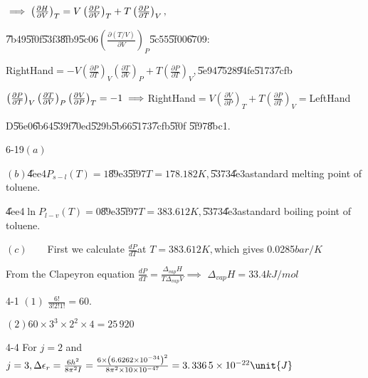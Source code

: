 \documentclass{article}
\begin{document}
$\implies \left( \frac{\partial H}{\partial V}\right) _{T}=V\left( \frac{%
\partial P}{\partial V}\right) _{T}+T\left( \frac{\partial P}{\partial T}%
\right) _{V},$

\U{7b49}\U{5f0f}\U{53f3}\U{8fb9}\U{5c06}$\left( \frac{\partial \left(
T/V\right) }{\partial V}\right) _{P}$\U{5c55}\U{5f00}\U{6709}:

\bigskip RightHand$=-V\left( \frac{\partial P}{\partial T}\right) _{V}\left( 
\frac{\partial T}{\partial V}\right) _{P}+T\left( \frac{\partial P}{\partial
T}\right) _{V},$\U{5e94}\U{7528}\U{94fe}\U{5173}\U{7cfb}

$\left( \frac{\partial P}{\partial T}\right) _{V}\left( \frac{\partial T}{%
\partial V}\right) _{P}\left( \frac{\partial V}{\partial P}\right)
_{T}=-1\implies $RightHand$=V\left( \frac{\partial V}{\partial P}\right)
_{T}+T\left( \frac{\partial P}{\partial T}\right) _{V}=$LeftHand

D\U{56e0}\U{6b64}\U{539f}\U{70ed}\U{529b}\U{5b66}\U{5173}\U{7cfb}\U{5f0f}%
\U{5f97}\U{8bc1}.

6-19$\left( a\right) $


$\left( b\right) $\U{4ee4}$P_{s-l}\left( T\right) =1$\U{89e3}\U{5f97}\qquad $%
T=178.182\unit{K},$\U{5373}\U{4e3a}standard melting point of toluene.

\U{4ee4}$\ln P_{l-v}\left( T\right) =0$\U{89e3}\U{5f97}\qquad $T=383.612%
\unit{K},$\U{5373}\U{4e3a}standard boiling point of toluene.

$\left( c\right) \qquad $First we calculate $\frac{dP}{dT}$at $T=383.612%
\unit{K},$which gives 0.0285$\unit{bar}/\unit{K}$

From the Clapeyron equation $\frac{dP}{dT}=\frac{\Delta _{vap}H}{T\Delta
_{vap}V}\implies $ $\Delta _{vap}H=33.4\unit{kJ}/\unit{mol}$

4-1 $\left( 1\right) $ $\frac{6!}{3!2!1!}=\allowbreak 60.$

$\left( 2\right) 60\times 3^{3}\times 2^{2}\times 4=\allowbreak 25\,920$

4-4 For $j=2$ and $j=3,\Delta \epsilon _{r}=\frac{6h^{2}}{8\pi ^{2}I}=\frac{%
6\times \left( 6.6262\times 10^{-34}\right) ^{2}}{8\pi ^{2}\times 10\times
10^{-47}}=\allowbreak 3.\,\allowbreak 336\,5\times 10^{-22}\unit{J}$
\end{document}
